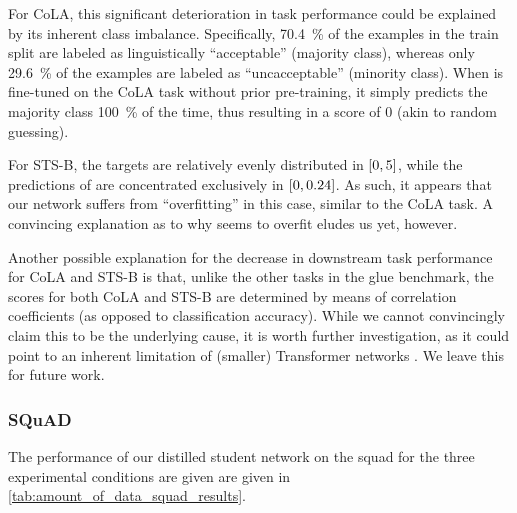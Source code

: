 For CoLA, this significant deterioration in task performance could be explained by its inherent class imbalance. Specifically, \SI{70.4}{\percent} of the examples in the train split are labeled as linguistically ``acceptable'' (majority class), whereas only \SI{29.6}{\percent} of the examples are labeled as ``uncacceptable'' (minority class). When \bertstudent is fine-tuned on the CoLA task without prior pre-training, it simply predicts the majority class \SI{100}{\percent} of the time, thus resulting in a score of 0 (akin to random guessing).

For STS-B, the targets are relatively evenly distributed in $\left[{0, 5}\right]$, while the predictions of \bertstudent are concentrated exclusively in $\left[{0, 0.24}\right]$. As such, it appears that our network suffers from ``overfitting'' in this case, similar to the CoLA task. A convincing explanation as to why \bertstudent seems to overfit eludes us yet, however.


%         


Another possible explanation for the decrease in downstream task performance for CoLA and STS-B is that, unlike the other tasks in the \gls{glue} benchmark, the scores for both CoLA and STS-B are determined by means of correlation coefficients (as opposed to classification accuracy). While we cannot convincingly claim this to be the underlying cause, it is worth further investigation, as it could point to an inherent limitation of (smaller) Transformer networks \citep{vaswani2017attention}. We leave this for future work.



\subsubsection{SQuAD}
The performance of our distilled student network \bertstudent on the \gls{squad} for the three experimental conditions are given are given in \cref{tab:amount_of_data_squad_results}.

